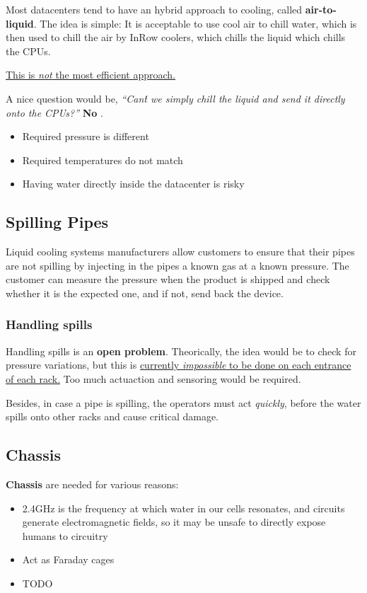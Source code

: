 \nl

Most datacenters tend to have an hybrid approach to cooling, called \textbf{air-to-liquid}.
The idea is simple:
It is acceptable to use cool air to chill water, which is then used to chill the air by InRow coolers, which chills the liquid which chills the CPUs.

\ul{This is \textit{not} the most efficient approach.}

A nice question would be, \textit{``Can\'t we simply chill the liquid and send it directly onto the CPUs?''} \textbf{No} \smiley.
\begin{itemize}
   \item Required pressure is different
   \item Required temperatures do not match
   \item Having water directly inside the datacenter is risky
\end{itemize}

\subsection{Spilling Pipes}
Liquid cooling systems manufacturers allow customers to ensure that their pipes are not spilling by injecting in the pipes a known gas at a known pressure.
The customer can measure the pressure when the product is shipped and check whether it is the expected one, and if not, send back the device.

\subsubsection*{Handling spills}
Handling spills is an \textbf{open problem}. 
Theorically, the idea would be to check for pressure variations, but this is \ul{currently \textit{impossible} to be done on each entrance of each rack.}
Too much actuaction and sensoring would be required.

Besides, in case a pipe is spilling, the operators must act \textit{quickly}, before the water spills onto other racks and cause critical damage. 

\subsection{Chassis}
\textbf{Chassis} are needed for various reasons:
\begin{itemize}
   \item 2.4GHz is the frequency at which water in our cells resonates, and circuits generate electromagnetic fields, so it may be unsafe to directly expose humans to circuitry
   \item Act as Faraday cages
   \item TODO
\end{itemize}